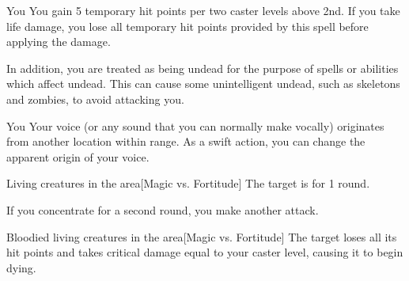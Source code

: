 \spelldur{\durlong}
\begin{spelltarget}{You}
    \spelleffect You gain 5 temporary hit points  per two caster levels above 2nd. If you take life damage, you lose all temporary hit points provided by this spell before applying the damage.

    In addition, you are treated as being undead for the purpose of spells or abilities which affect undead. This can cause some unintelligent undead, such as skeletons and zombies, to avoid attacking you.
\end{spelltarget}

\spellrng{\rngmed}
\spelldur{\durshort \dismissable}
\begin{spelltarget}{You}
    \spelleffect Your voice (or any sound that you can normally make vocally) originates from another location within range. As a swift action, you can change the apparent origin of your voice.
\end{spelltarget}

\begin{comment}
\spellsection{Vestments of the Mage}{2}
\spelldesc{You imbue a set of armor with magical power, preventing it from interfering with your spellcasting.}
\spellinfo{Trans (Imbuement)}{Arcane}
\spelltwocol{\spelltgt{One nonmagical armor or shield}}{\spellrng{Touch}}
\spelldur{\durext \dismissable}
\spelleffect The armor or shield's chance of arcane spell failure decreases by 10\% as long as you are wearing or using it. If any other creature wears the armor, it receives no benefit from this spell.
\spellnotes This decrease is considered an enhancement enhancement bonus.
\end{comment}

\begin{spelltargets}{Living creatures in the area}[Magic vs. Fortitude]
    \spellsuccess The target is \staggered for 1 round.
\end{spelltargets}
\spellspecial If you concentrate for a second round, you make another attack.
\begin{spelltargets}{Bloodied living creatures in the area}[Magic vs. Fortitude]
    \spellsuccess The target loses all its hit points and takes critical damage equal to your caster level, causing it to begin dying.
\end{spelltargets}

